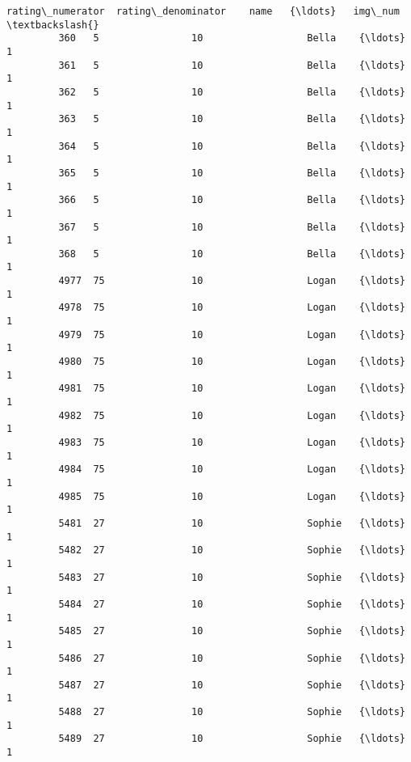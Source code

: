 \documentclass[11pt]{article}
\begin{document}
\begin{Verbatim}[commandchars=\\\{\}]
              rating\_numerator  rating\_denominator    name   {\ldots}   img\_num  \textbackslash{}
         360   5                10                  Bella    {\ldots}    1        
         361   5                10                  Bella    {\ldots}    1        
         362   5                10                  Bella    {\ldots}    1        
         363   5                10                  Bella    {\ldots}    1        
         364   5                10                  Bella    {\ldots}    1        
         365   5                10                  Bella    {\ldots}    1        
         366   5                10                  Bella    {\ldots}    1        
         367   5                10                  Bella    {\ldots}    1        
         368   5                10                  Bella    {\ldots}    1        
         4977  75               10                  Logan    {\ldots}    1        
         4978  75               10                  Logan    {\ldots}    1        
         4979  75               10                  Logan    {\ldots}    1        
         4980  75               10                  Logan    {\ldots}    1        
         4981  75               10                  Logan    {\ldots}    1        
         4982  75               10                  Logan    {\ldots}    1        
         4983  75               10                  Logan    {\ldots}    1        
         4984  75               10                  Logan    {\ldots}    1        
         4985  75               10                  Logan    {\ldots}    1        
         5481  27               10                  Sophie   {\ldots}    1        
         5482  27               10                  Sophie   {\ldots}    1        
         5483  27               10                  Sophie   {\ldots}    1        
         5484  27               10                  Sophie   {\ldots}    1        
         5485  27               10                  Sophie   {\ldots}    1        
         5486  27               10                  Sophie   {\ldots}    1        
         5487  27               10                  Sophie   {\ldots}    1        
         5488  27               10                  Sophie   {\ldots}    1        
         5489  27               10                  Sophie   {\ldots}    1        
         

\end{Verbatim}
\end{document}

